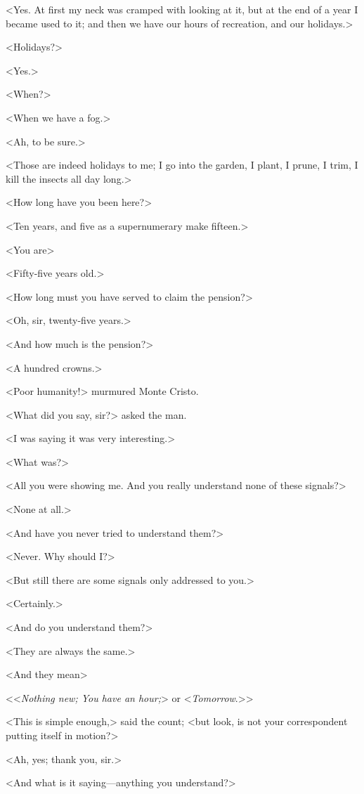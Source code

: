  <Yes. At first my neck was cramped with looking at it, but at the end of a year I became used to it; and then we have our hours of recreation, and our holidays.> 

 <Holidays?> 

 <Yes.> 

 <When?> 

 <When we have a fog.> 

 <Ah, to be sure.> 

 <Those are indeed holidays to me; I go into the garden, I plant, I prune, I trim, I kill the insects all day long.> 

 <How long have you been here?> 

 <Ten years, and five as a supernumerary make fifteen.> 

 <You are\longdash> 

 <Fifty-five years old.> 

 <How long must you have served to claim the pension?> 

 <Oh, sir, twenty-five years.> 

 <And how much is the pension?> 

 <A hundred crowns.> 

 <Poor humanity!> murmured Monte Cristo. 

 <What did you say, sir?> asked the man. 

 <I was saying it was very interesting.> 

 <What was?> 

 <All you were showing me. And you really understand none of these signals?> 

 <None at all.> 

 <And have you never tried to understand them?> 

 <Never. Why should I?> 

 <But still there are some signals only addressed to you.> 

 <Certainly.> 

 <And do you understand them?> 

 <They are always the same.> 

 <And they mean\longdash> 

 <<\textit{Nothing new; You have an hour;}> or <\textit{Tomorrow}.>> 

 <This is simple enough,> said the count; <but look, is not your correspondent putting itself in motion?> 

 <Ah, yes; thank you, sir.> 

 <And what is it saying—anything you understand?> 

